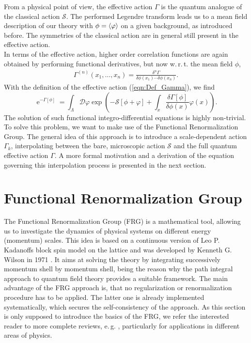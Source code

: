 From a physical point of view, the effective action $\Gamma$ is the quantum analogue of the classical action $\mathcal{S}$. The performed Legendre transform leads us to a mean field description of our theory with $\phi = \langle \varphi \rangle$ on a given background, as introduced before. The symmetries of the classical action are in general still present in the effective action.\\
In terms of the effective action, higher order correlation functions are again obtained by performing functional derivatives, but now w.\,r.\,t. the mean field $\phi$,
\begin{align}
	\Gamma^{(n)}\left(x_{1}, \ldots, x_{n}\right)=\frac{\delta^{n} \Gamma}{\delta \phi\left(x_{1}\right) \cdots \delta \phi\left(x_{n}\right)}.
\end{align}
With the definition of the effective action (\ref{eqn:Def_Gamma}), we find
\begin{equation}
	\operatorname{e}^{-\Gamma[\phi]}=\int_{\Lambda} \mathcal{D} \varphi \exp \left(-\mathcal{S}[\phi+\varphi]+\int_x \frac{\delta \Gamma[\phi]}{\delta \phi(x)} \varphi(x)\right).
\end{equation}  
The solution of such functional integro-differential equations is highly non-trivial. To solve this problem, we want to make use of the Functional Renormalization Group. The general idea of this approach is to introduce a scale-dependent action $\Gamma_k$, interpolating between the bare, microscopic action $\mathcal{S}$ and the full quantum effective action $\Gamma$. A more formal motivation and a derivation of the equation governing this interpolation process is presented in the next section.   
 \section{Functional Renormalization Group}
The Functional Renormalization Group (FRG) is a mathematical tool, allowing us to investigate the dynamics of physical systems on different energy (momentum) scales. This idea is based on a continuous version of Leo P. Kadanoffs block spin model on the lattice \cite{Kadanoff1966} and was developed by Kenneth G. Wilson in 1971 \cite{Wilson1971}. It aims at solving the theory by integrating successively momentum shell by momentum shell, being the reason why the path integral approach to quantum field theory provides a suitable framework. The main advantage of the FRG approach is, that no regularization or renormalization procedure has to be applied. The latter one is already implemented systematically, which secures the self-consistency of the approach. As this section is only supposed to introduce the basics of the FRG, we refer the interested reader to more complete reviews, e.\,g. \cite{Pawlowski2005, Gies2006}, particularly for applications in different areas of physics.

